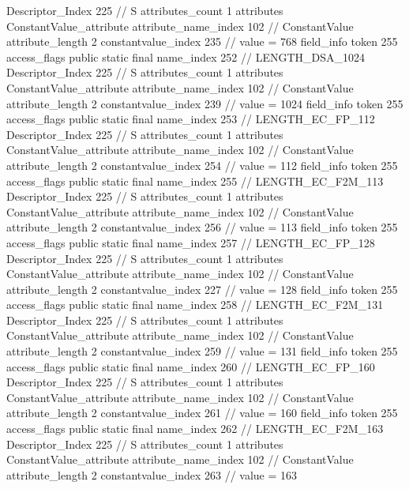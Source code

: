 {{{{{				Descriptor_Index	225		// S
				attributes_count	1
				attributes {
				ConstantValue_attribute {
					attribute_name_index	102		// ConstantValue
					attribute_length	2
					constantvalue_index	235		// value = 768
				}
				}
			}
			field_info {
				token	255
				access_flags	public static final
				name_index	252		// LENGTH_DSA_1024
				Descriptor_Index	225		// S
				attributes_count	1
				attributes {
				ConstantValue_attribute {
					attribute_name_index	102		// ConstantValue
					attribute_length	2
					constantvalue_index	239		// value = 1024
				}
				}
			}
			field_info {
				token	255
				access_flags	public static final
				name_index	253		// LENGTH_EC_FP_112
				Descriptor_Index	225		// S
				attributes_count	1
				attributes {
				ConstantValue_attribute {
					attribute_name_index	102		// ConstantValue
					attribute_length	2
					constantvalue_index	254		// value = 112
				}
				}
			}
			field_info {
				token	255
				access_flags	public static final
				name_index	255		// LENGTH_EC_F2M_113
				Descriptor_Index	225		// S
				attributes_count	1
				attributes {
				ConstantValue_attribute {
					attribute_name_index	102		// ConstantValue
					attribute_length	2
					constantvalue_index	256		// value = 113
				}
				}
			}
			field_info {
				token	255
				access_flags	public static final
				name_index	257		// LENGTH_EC_FP_128
				Descriptor_Index	225		// S
				attributes_count	1
				attributes {
				ConstantValue_attribute {
					attribute_name_index	102		// ConstantValue
					attribute_length	2
					constantvalue_index	227		// value = 128
				}
				}
			}
			field_info {
				token	255
				access_flags	public static final
				name_index	258		// LENGTH_EC_F2M_131
				Descriptor_Index	225		// S
				attributes_count	1
				attributes {
				ConstantValue_attribute {
					attribute_name_index	102		// ConstantValue
					attribute_length	2
					constantvalue_index	259		// value = 131
				}
				}
			}
			field_info {
				token	255
				access_flags	public static final
				name_index	260		// LENGTH_EC_FP_160
				Descriptor_Index	225		// S
				attributes_count	1
				attributes {
				ConstantValue_attribute {
					attribute_name_index	102		// ConstantValue
					attribute_length	2
					constantvalue_index	261		// value = 160
				}
				}
			}
			field_info {
				token	255
				access_flags	public static final
				name_index	262		// LENGTH_EC_F2M_163
				Descriptor_Index	225		// S
				attributes_count	1
				attributes {
				ConstantValue_attribute {
					attribute_name_index	102		// ConstantValue
					attribute_length	2
					constantvalue_index	263		// value = 163
}}}}}}}
